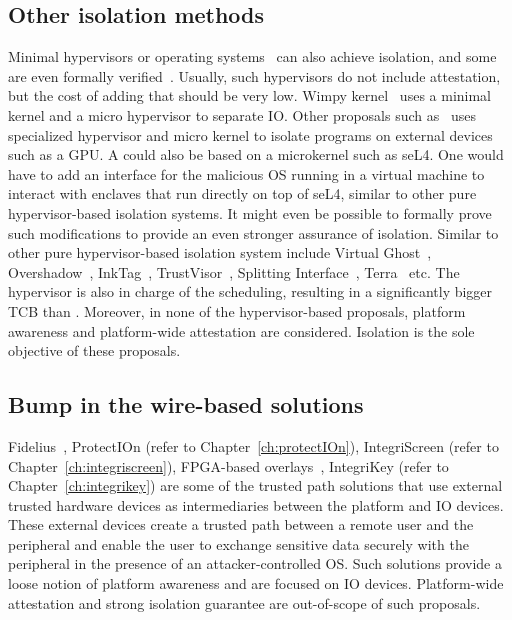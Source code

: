 \subsection{Other isolation methods} 

Minimal hypervisors or operating systems~\cite{herder2006minix,klein2009sel4} can also achieve isolation, and some are even formally verified~\cite{klein2009sel4}. Usually, such hypervisors do not include attestation, but the cost of adding that should be very low. 
Wimpy kernel~\cite{wimpyKernel} uses a minimal kernel and a micro hypervisor to separate IO. Other proposals such as~\cite{5695613,iosep, 10.1145/2493123.2462914} uses specialized hypervisor and micro kernel to isolate programs on external devices such as a GPU. A \name{} could also be based on a microkernel such as seL4. One would have to add an interface for the malicious OS running in a virtual machine to interact with enclaves that run directly on top of seL4, similar to other pure hypervisor-based isolation systems. It might even be possible to formally prove such modifications to provide an even stronger assurance of isolation. Similar to other pure hypervisor-based isolation system include Virtual Ghost~\cite{criswell2014virtual}, Overshadow~\cite{Overshadow}, InkTag~\cite{hofmann2013inktag}, TrustVisor~\cite{mccune2010trustvisor}, Splitting Interface~\cite{ta2006splitting}, Terra~\cite{garfinkel2003terra} etc.  The hypervisor is also in charge of the scheduling, resulting in a significantly bigger TCB than \name. Moreover, in none of the hypervisor-based proposals, platform awareness and platform-wide attestation are considered. Isolation is the sole objective of these proposals.

\subsection{Bump in the wire-based solutions} 

Fidelius~\cite{Fidelius}, ProtectIOn (refer to Chapter~\ref{ch:protectIOn}), IntegriScreen (refer to Chapter~\ref{ch:integriscreen}), FPGA-based overlays~\cite{brandon2017trusted}, IntegriKey (refer to Chapter~\ref{ch:integrikey}) are some of the trusted path solutions that use external trusted hardware devices as intermediaries between the platform and IO devices. These external devices create a trusted path between a remote user and the peripheral and enable the user to exchange sensitive data securely with the peripheral in the presence of an attacker-controlled OS. Such solutions provide a loose notion of platform awareness and are focused on IO devices. Platform-wide attestation and strong isolation guarantee are out-of-scope of such proposals. 



%     

